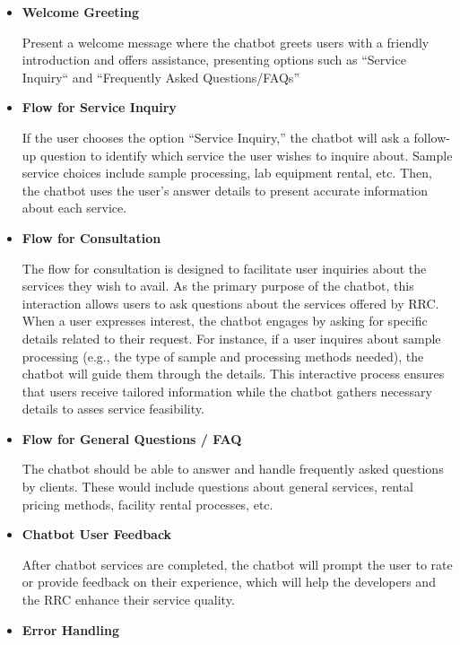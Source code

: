 \begin{itemize}
	\item \textbf{Welcome Greeting}
	
	\subitem Present a welcome message where the chatbot greets users with a friendly introduction and offers assistance, presenting options such as “Service Inquiry“ and “Frequently Asked Questions/FAQs”
	
	\item \textbf{Flow for Service Inquiry}
	
	\subitem If the user chooses the option “Service Inquiry,” the chatbot will ask a follow-up question to identify which service the user wishes to inquire about. Sample service choices include sample processing,  lab equipment rental, etc. Then, the chatbot uses the user's answer details to present accurate information about each service. 
	
	\item \textbf{Flow for Consultation}
	
	\subitem The flow for consultation is designed to facilitate user inquiries about the services they wish to avail. As the primary purpose of the chatbot, this interaction allows users to ask questions about the services offered by RRC. When a user expresses interest, the chatbot engages by asking for specific details related to their request. For instance, if a user inquires about sample processing (e.g., the type of sample and processing methods needed), the chatbot will guide them through the details. This interactive process ensures that users receive tailored information while the chatbot gathers necessary details to asses service feasibility.
	
	\item \textbf{Flow for General Questions / FAQ}
	
	\subitem The chatbot should be able to answer and handle frequently asked questions by clients. These would include questions about general services, rental pricing methods, facility rental processes, etc.
	
	\item \textbf{Chatbot User Feedback}
	
	\subitem After chatbot services are completed, the chatbot will prompt the user to rate or provide feedback on their experience, which will help the developers and the RRC enhance their service quality.
	
	\item \textbf{Error Handling}
	

\end{itemize}
